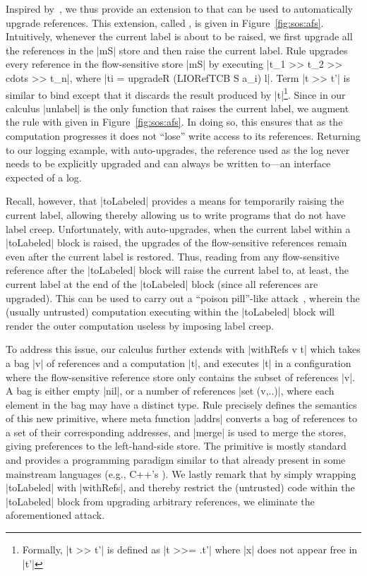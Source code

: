 Inspired by~\citep{Hedin13}, we thus provide an extension to \liofs{} that can
be used to automatically upgrade references.
%
This extension, called \lioafs{}, is given in Figure~\ref{fig:sos:afs}.
%
Intuitively, whenever the current label is about to be raised, we first upgrade
all the references in the |mS| store %
and then raise the current label.
%
Rule  upgrades every reference in the flow-sensitive store
|mS| by executing |t_1 >> t_2 >> cdots >> t_n|, where 
|ti = upgradeR (LIORefTCB S a_i) l|. Term |t >> t'| is
similar to bind except that it discards the result produced by
|t|\footnote{Formally, |t >> t'| is defined as |t >>= \x.t'| where |x| does not
  appear free in |t'|}. 
%
Since in our calculus |unlabel| is the only function that raises the current
label, we augment the  rule with  given in
Figure~\ref{fig:sos:afs}.
%
In doing so, this ensures that as the computation progresses it does not
``lose'' write access to its references.
%
Returning to our logging example, with auto-upgrades, the reference used as the
log never needs to be explicitly upgraded and can always be written to---an
interface expected of a log.

Recall, however, that |toLabeled| provides a means for temporarily raising the
current label, allowing thereby allowing us to write programs that do not have
label creep.
%
Unfortunately, with auto-upgrades, when the current label within a |toLabeled|
block is raised, the upgrades of the flow-sensitive references remain even
after the current label is restored.
%
Thus, reading from any flow-sensitive reference after the |toLabeled|
block will raise the current label to, at least, the current label at the end
of the |toLabeled| block (since all references are upgraded).
%
This can be used to carry out a ``poison pill''-like attack~, wherein
the (usually untrusted) computation executing within the |toLabeled| block will
render the outer computation useless by imposing label creep.

To address this issue, our \lioafs{} calculus further extends \liofs{} with
|withRefs v t| which takes a bag |v| of references and a computation |t|, and
executes |t| in a configuration where the flow-sensitive reference store only
contains the subset of references |v|.
%
A bag is either empty |nil|, or a number of references |set (v,..)|, where each
element in the bag may have a distinct type.
%
Rule  precisely defines the semantics of this new primitive,
where meta function |addrs| converts a bag of references to a set of their
corresponding addresses, and |merge| is used to merge the stores, giving
preferences to the left-hand-side store.
%
The primitive is mostly standard and provides a programming paradigm similar to
that already present in some mainstream languages (e.g., C++'s ).
%
We lastly remark that by simply wrapping |toLabeled| with |withRefs|, and
thereby restrict the (untrusted) code within the |toLabeled| block from
upgrading arbitrary references, we eliminate the aforementioned attack.


